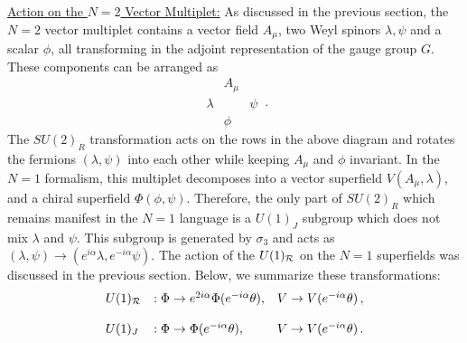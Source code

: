 \noindent\underline{Action on the $N=2$ Vector Multiplet:}
As discussed in the previous section, the $N=2$ vector multiplet
contains a vector field $A_\mu$, two Weyl spinors $\lambda, \psi$ and a
scalar $\phi$, all transforming in the adjoint representation of the
gauge group $G$. These components can be arranged as
$$
\begin{array}{ccc}
 & A_\mu & \\
 \lambda & & \psi \\
 & \phi &
\end{array}\,.
$$
The $SU(2)_R$ transformation acts on the rows in the above diagram and
rotates the fermions $(\lambda,\psi)$ into each other while keeping
$A_\mu$ and $\phi$ invariant. In the
$N=1$ formalism, this multiplet decomposes into a vector superfield
$V(A_\mu, \lambda)$, and a chiral superfield $\Phi(\phi,\psi)$.    
Therefore, the only part of $SU(2)_R$ which remains manifest in the
$N=1$ language is a $U(1)_J$ subgroup which does not mix $\lambda$ and
$\psi$. This subgroup is generated by $\sigma_3$ and acts as 
$(\lambda,\psi)\rightarrow(e^{i\alpha}\lambda,e^{-i\alpha}\psi)$. 
The action of the $U(1)_{\cal R}$ on the $N=1$ superfields was
discussed in the previous section. Below, we summarize these
transformations:
\begin{equation}
\begin{array}{lll}
U(1)_{\cal R} &: \Phi\rightarrow e^{2i\alpha}\Phi(e^{-i\alpha}\theta),
&V\rightarrow V(e^{-i\alpha}\theta)\,,
\\ \\
U(1)_J &: \Phi \rightarrow \Phi (e^{-i\alpha}\theta), &
V\rightarrow V(e^{-i\alpha}\theta)\,.
\end{array}
\label{Rb1}
\end{equation}

